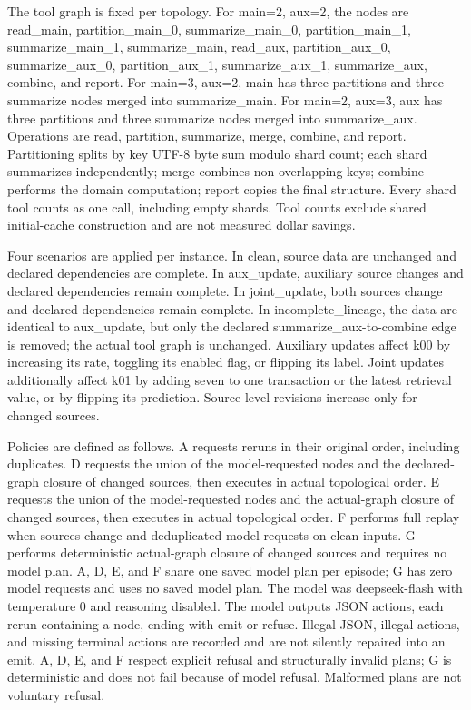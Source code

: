 \documentclass{article}
\begin{document}
The tool graph is fixed per topology. For main=2, aux=2, the nodes are read\_main, partition\_main\_0, summarize\_main\_0, partition\_main\_1, summarize\_main\_1, summarize\_main, read\_aux, partition\_aux\_0, summarize\_aux\_0, partition\_aux\_1, summarize\_aux\_1, summarize\_aux, combine, and report. For main=3, aux=2, main has three partitions and three summarize nodes merged into summarize\_main. For main=2, aux=3, aux has three partitions and three summarize nodes merged into summarize\_aux. Operations are read, partition, summarize, merge, combine, and report. Partitioning splits by key UTF-8 byte sum modulo shard count; each shard summarizes independently; merge combines non-overlapping keys; combine performs the domain computation; report copies the final structure. Every shard tool counts as one call, including empty shards. Tool counts exclude shared initial-cache construction and are not measured dollar savings.

Four scenarios are applied per instance. In clean, source data are unchanged and declared dependencies are complete. In aux\_update, auxiliary source changes and declared dependencies remain complete. In joint\_update, both sources change and declared dependencies remain complete. In incomplete\_lineage, the data are identical to aux\_update, but only the declared summarize\_aux-to-combine edge is removed; the actual tool graph is unchanged. Auxiliary updates affect k00 by increasing its rate, toggling its enabled flag, or flipping its label. Joint updates additionally affect k01 by adding seven to one transaction or the latest retrieval value, or by flipping its prediction. Source-level revisions increase only for changed sources.

Policies are defined as follows. A requests reruns in their original order, including duplicates. D requests the union of the model-requested nodes and the declared-graph closure of changed sources, then executes in actual topological order. E requests the union of the model-requested nodes and the actual-graph closure of changed sources, then executes in actual topological order. F performs full replay when sources change and deduplicated model requests on clean inputs. G performs deterministic actual-graph closure of changed sources and requires no model plan. A, D, E, and F share one saved model plan per episode; G has zero model requests and uses no saved model plan. The model was deepseek-flash with temperature 0 and reasoning disabled. The model outputs JSON actions, each rerun containing a node, ending with emit or refuse. Illegal JSON, illegal actions, and missing terminal actions are recorded and are not silently repaired into an emit. A, D, E, and F respect explicit refusal and structurally invalid plans; G is deterministic and does not fail because of model refusal. Malformed plans are not voluntary refusal.
\end{document}
